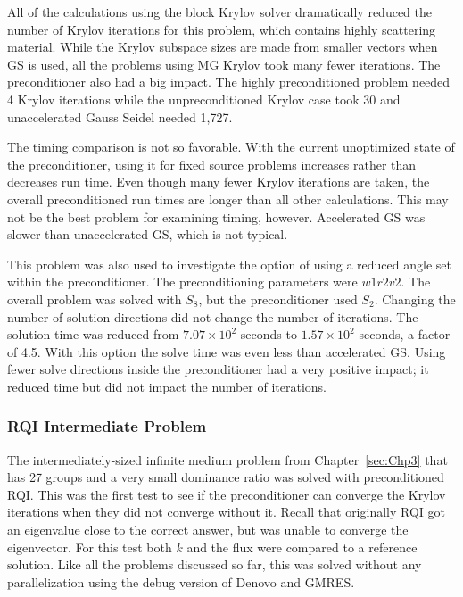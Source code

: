 All of the calculations using the block Krylov solver dramatically reduced the number of Krylov iterations for this problem, which contains highly scattering material. While the Krylov subspace sizes are made from smaller vectors when GS is used, all the problems using MG Krylov took many fewer iterations. The preconditioner also had a big impact. The highly preconditioned problem needed 4 Krylov iterations while the unpreconditioned Krylov case took 30 and unaccelerated Gauss Seidel needed 1,727.  

The timing comparison is not so favorable. With the current unoptimized state of the preconditioner, using it for fixed source problems increases rather than decreases run time. Even though many fewer Krylov iterations are taken, the overall preconditioned run times are longer than all other calculations. This may not be the best problem for examining timing, however. Accelerated GS was slower than unaccelerated GS, which is not typical.

This problem was also used to investigate the option of using a reduced angle set within the preconditioner. The preconditioning parameters were $w1r2v2$. The overall problem was solved with $S_{8}$, but the preconditioner used $S_{2}$. Changing the number of solution directions did not change the number of iterations. The solution time was reduced from $7.07 \times 10^{2}$ seconds to $1.57 \times 10^{2}$ seconds, a factor of 4.5. With this option the solve time was even less than accelerated GS. Using fewer solve directions inside the preconditioner had a very positive impact; it reduced time but did not impact the number of iterations.

\subsubsection{RQI Intermediate Problem}
The intermediately-sized infinite medium problem from Chapter~\ref{sec:Chp3} that has 27 groups and a very small dominance ratio was solved with preconditioned RQI. This was the first test to see if the preconditioner can converge the Krylov iterations when they did not converge without it. Recall that originally RQI got an eigenvalue close to the correct answer, but was unable to converge the eigenvector. For this test both $k$ and the flux were compared to a reference solution. Like all the problems discussed so far, this was solved without any parallelization using the debug version of Denovo and GMRES. 

